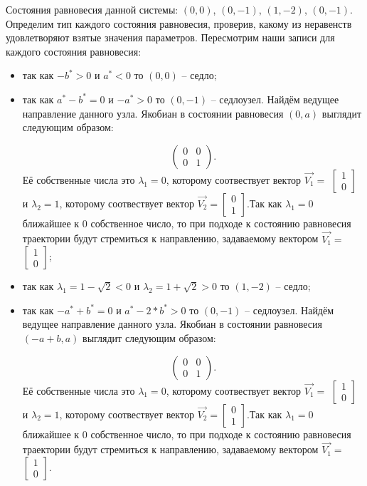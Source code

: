 Состояния равновесия данной системы: $(0, 0)$, $(0, -1)$, $(1, -2)$, $(0, -1)$. Определим тип каждого состояния равновесия, проверив, какому из неравенств удовлетворяют взятые значения параметров.  Пересмотрим наши записи для каждого состояния равновесия: 
\begin{itemize}
	\item{ так как $-b^\ast > 0 $ и $a^\ast  < 0 $ то $(0, 0)$ -- седло;}
	\item{ так как $a^\ast - b^\ast = 0 $ и $-a^\ast > 0 $ то $(0, -1)$ -- седлоузел. Найдём ведущее направление данного узла. Якобиан в состоянии равновесия $(0, a)$ выглядит следующим образом:
		
		$$\begin{pmatrix}0 & 0\\0 & 1\end{pmatrix}. $$Её собственные числа это $\lambda_1=0$, которому соотвествует вектор $\Vec{V_1}=$ $\left[\begin{matrix}1\\0\end{matrix}\right]$ и $\lambda_2=1$, которому соотвествует вектор $\Vec{V_2}=$$\left[\begin{matrix}0\\1\end{matrix}\right]$.Так как $\lambda_1=0$ ближайшее к $0$ собственное число, то при подходе к состоянию равновесия траектории будут стремиться к направлению, задаваемому вектором $\Vec{V_1}=$ $\left[\begin{matrix}1\\0\end{matrix}\right]$;}
	\item{ так как ${\lambda_{1}} = 1 - \sqrt{2}$$  < 0 $ и ${\lambda_{2}} = 1 + \sqrt{2}$$ > 0 $ то $(1, -2)$ -- седло;}
	\item{ так как $-a^\ast + b^\ast = 0 $ и $a^\ast - 2*b^\ast > 0 $ то $(0, -1)$ -- седлоузел. Найдём ведущее направление данного узла. Якобиан в состоянии равновесия $(-a + b, a)$ выглядит следующим образом:
		
		$$\begin{pmatrix}0 & 0\\0 & 1\end{pmatrix}. $$Её собственные числа это $\lambda_1=0$, которому соотвествует вектор $\Vec{V_1}=$ $\left[\begin{matrix}1\\0\end{matrix}\right]$ и $\lambda_2=1$, которому соотвествует вектор $\Vec{V_2}=$$\left[\begin{matrix}0\\1\end{matrix}\right]$.Так как $\lambda_1=0$ ближайшее к $0$ собственное число, то при подходе к состоянию равновесия траектории будут стремиться к направлению, задаваемому вектором $\Vec{V_1}=$ $\left[\begin{matrix}1\\0\end{matrix}\right]$.}
\end{itemize} 

